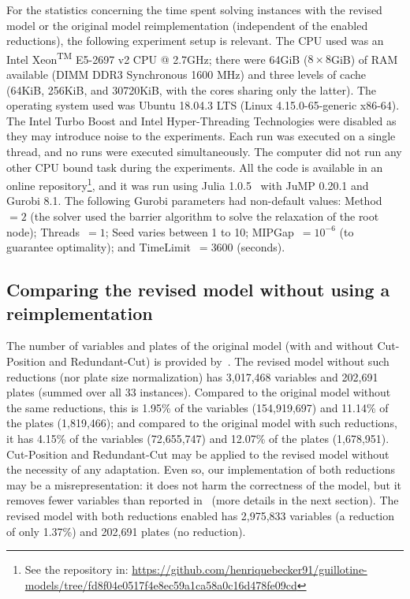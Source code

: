 For the statistics concerning the time spent solving instances with the revised model or the original model reimplementation (independent of the enabled reductions), the following experiment setup is relevant.
The CPU used was an Intel\textsuperscript{\textregistered} Xeon\textsuperscript{TM} E5-2697 v2 CPU @ 2.7GHz;
there were 64GiB (\(8 \times 8\)GiB) of RAM available (DIMM DDR3 Synchronous 1600 MHz) and three levels of cache (64KiB, 256KiB, and 30720KiB, with the cores sharing only the latter).
The operating system used was Ubuntu 18.04.3 LTS (Linux 4.15.0-65-generic x86-64).
The Intel\textsuperscript{\textregistered} Turbo Boost and Intel\textsuperscript{\textregistered} Hyper-Threading Technologies were disabled as they may introduce noise to the experiments.
Each run was executed on a single thread, and no runs were executed simultaneously.
The computer did not run any other CPU bound task during the experiments.
All the code is available in an online repository\footnote{See the repository in: \url{https://github.com/henriquebecker91/guillotine-models/tree/fd8f04e0517f4e8ec59a1ca58a0c16d478fe09cd}}, and it was run using Julia 1.0.5~\cite{julia} with JuMP 0.20.1 and Gurobi 8.1.%
The following Gurobi parameters had non-default values: Method~\(= 2\) (the solver used the barrier algorithm to solve the relaxation of the root node); Threads~\(= 1\); Seed varies between 1 to 10; MIPGap~\(= 10^{-6}\) (to guarantee optimality); and TimeLimit~\(= 3600\) (seconds).

\subsection{Comparing the revised model without using a reimplementation}

The number of variables and plates of the original model (with and without Cut-Position and Redundant-Cut) is provided by~\cite{dimitri_thesis}.
The revised model without such reductions (nor plate size normalization) has 3,017,468 variables and 202,691 plates (summed over all 33 instances). Compared to the original model without the same reductions, this is 1.95\% of the variables (154,919,697) and 11.14\% of the plates (1,819,466); and compared to the original model with such reductions, it has 4.15\% of the variables (72,655,747) and 12.07\% of the plates (1,678,951).
Cut-Position and Redundant-Cut may be applied to the revised model without the necessity of any adaptation.
Even so, our implementation of both reductions may be a misrepresentation: it does not harm the correctness of the model, but it removes fewer variables than reported in~\cite{dimitri_thesis} (more details in the next section).
The revised model with both reductions enabled has 2,975,833 variables (a reduction of only 1.37\%) and 202,691 plates (no reduction). 

